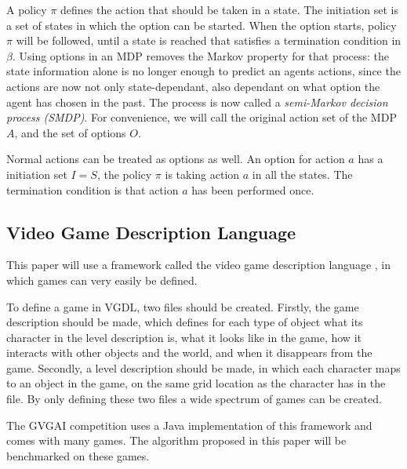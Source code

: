 A policy $\pi$ defines the action that should be taken in a state. The
initiation set is a set of states in which the option can be started. When the
option starts, policy $\pi$ will be followed, until a state is reached that
satisfies a termination condition in $\beta$. Using options in an MDP removes
the Markov property for that process: the state information alone is no longer
enough to predict an agents actions, since the actions are now not only
state-dependant, also dependant on what option the agent has chosen in the past.
The process is now called a \emph{semi-Markov decision process (SMDP)}. For
convenience, we will call the original action set of the MDP $A$, and the set of
options $O$.

Normal actions can be treated as options as well. An option for action $a$ has a
initiation set $I = S$, the policy $\pi$ is taking action $a$ in all the states.
The termination condition is that action $a$ has been performed once.

\subsection{Video Game Description Language}
\label{subsec:vgdl}
This paper will use a framework called the video game description
language \cite{schaul2013video}, in which games can very easily be defined.

To define a game in VGDL, two files should be created. Firstly, the game
description should be made, which defines for each type of object what its
character in the level description is, what it looks like in the game, how it
interacts with other objects and the world, and when it disappears from the
game. Secondly, a level description should be made, in which each character maps
to an object in the game, on the same grid location as the character has in the
file. By only defining these two files a wide spectrum of games can be created.

The GVGAI competition uses a Java implementation of this framework and comes
with many games. The algorithm proposed in this paper will be benchmarked on
these games.


